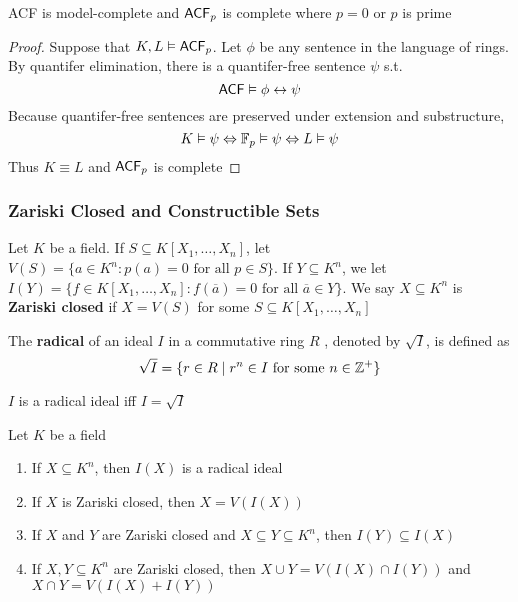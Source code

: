 \documentclass[11pt]{article}
\begin{document}
\begin{corollary}[]
\label{cor3.2.3}
ACF is model-complete and \(\textsf{ACF}_p\) is complete where \(p=0\) or \(p\) is prime
\end{corollary}
\begin{proof}
Suppose that \(K,L\vDash\textsf{ACF}_p\). Let \(\phi\) be any sentence in the language
of rings. By quantifer elimination, there is a quantifer-free sentence \(\psi\)
s.t.
\begin{equation*}
\textsf{ACF}\vDash\phi\leftrightarrow\psi
\end{equation*}
Because quantifer-free sentences are preserved under extension and
substructure,
\begin{equation*}
K\vDash\psi\Leftrightarrow\mathbb{F}_p\vDash\psi\Leftrightarrow L\vDash\psi
\end{equation*}
Thus \(K\equiv L\) and \(\textsf{ACF}_p\) is complete
\end{proof}

\subsubsection{Zariski Closed and Constructible Sets}
\label{sec:orged4cefc}
Let \(K\) be a field. If \(S\subseteq K[X_1,\dots,X_n]\), let
\(V(S)=\{a\in K^n:p(a)=0\text{ for all }p\in S\}\). If \(Y\subseteq K^n\),
we let
\(I(Y)=\{f\in K[X_1,\dots,X_n]:f(\overbar{a})=0\text{ for all
    }\overbar{a}\in Y\}\).
We say \(X\subseteq K^n\) is \textbf{Zariski closed} if \(X=V(S)\) for some
\(S\subseteq K[X_1,\dots,X_n]\)

The \textbf{radical} of an ideal \(I\) in a commutative ring \(R\)
, denoted by \(\sqrt{I}\), is defined as
\begin{equation*}
\sqrt{I}=\{r\in R\mid r^n\in I\text{ for some }n\in\mathbb{Z}^+\}
\end{equation*}

\(I\) is a radical ideal iff \(I=\sqrt{I}\)

\begin{lemma}[]
\label{lemma3.2.4}
Let \(K\) be a field
\begin{enumerate}
\item If \(X\subseteq K^n\), then \(I(X)\) is a radical ideal
\item If \(X\) is Zariski closed, then \(X=V(I(X))\)
\item If \(X\) and \(Y\) are Zariski closed and \(X\subseteq Y\subseteq K^n\),
then \(I(Y)\subseteq I(X)\)
\item If \(X,Y\subseteq K^n\) are Zariski closed, then \(X\cup Y=V(I(X)\cap
       I(Y))\) and \(X\cap Y=V(I(X)+I(Y))\)
\end{enumerate}
\end{lemma}
\end{document}
